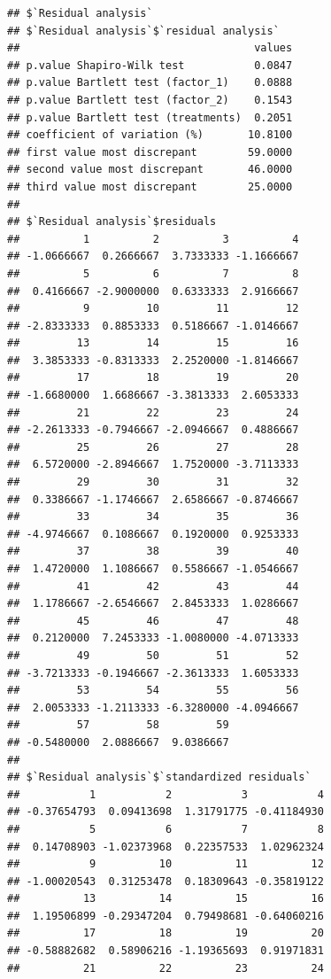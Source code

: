 \documentclass[
]{article}
\begin{document}
\begin{verbatim}
## $`Residual analysis`
## $`Residual analysis`$`residual analysis`
##                                     values
## p.value Shapiro-Wilk test           0.0847
## p.value Bartlett test (factor_1)    0.0888
## p.value Bartlett test (factor_2)    0.1543
## p.value Bartlett test (treatments)  0.2051
## coefficient of variation (%)       10.8100
## first value most discrepant        59.0000
## second value most discrepant       46.0000
## third value most discrepant        25.0000
## 
## $`Residual analysis`$residuals
##          1          2          3          4 
## -1.0666667  0.2666667  3.7333333 -1.1666667 
##          5          6          7          8 
##  0.4166667 -2.9000000  0.6333333  2.9166667 
##          9         10         11         12 
## -2.8333333  0.8853333  0.5186667 -1.0146667 
##         13         14         15         16 
##  3.3853333 -0.8313333  2.2520000 -1.8146667 
##         17         18         19         20 
## -1.6680000  1.6686667 -3.3813333  2.6053333 
##         21         22         23         24 
## -2.2613333 -0.7946667 -2.0946667  0.4886667 
##         25         26         27         28 
##  6.5720000 -2.8946667  1.7520000 -3.7113333 
##         29         30         31         32 
##  0.3386667 -1.1746667  2.6586667 -0.8746667 
##         33         34         35         36 
## -4.9746667  0.1086667  0.1920000  0.9253333 
##         37         38         39         40 
##  1.4720000  1.1086667  0.5586667 -1.0546667 
##         41         42         43         44 
##  1.1786667 -2.6546667  2.8453333  1.0286667 
##         45         46         47         48 
##  0.2120000  7.2453333 -1.0080000 -4.0713333 
##         49         50         51         52 
## -3.7213333 -0.1946667 -2.3613333  1.6053333 
##         53         54         55         56 
##  2.0053333 -1.2113333 -6.3280000 -4.0946667 
##         57         58         59 
## -0.5480000  2.0886667  9.0386667 
## 
## $`Residual analysis`$`standardized residuals`
##           1           2           3           4 
## -0.37654793  0.09413698  1.31791775 -0.41184930 
##           5           6           7           8 
##  0.14708903 -1.02373968  0.22357533  1.02962324 
##           9          10          11          12 
## -1.00020543  0.31253478  0.18309643 -0.35819122 
##          13          14          15          16 
##  1.19506899 -0.29347204  0.79498681 -0.64060216 
##          17          18          19          20 
## -0.58882682  0.58906216 -1.19365693  0.91971831 
##          21          22          23          24 

\end{verbatim}
\end{document}
